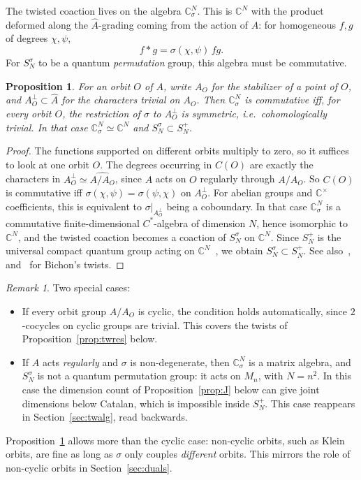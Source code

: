 \documentclass[11pt]{amsart}
\newtheorem{proposition}[theorem]{Proposition}
\theoremstyle{definition}
\theoremstyle{remark}
\newtheorem{remark}[theorem]{Remark}
\theoremstyle{plain}
\numberwithin{equation}{section}
\numberwithin{table}{section}
\newcommand{\C}{\mathbb C}
\begin{document}
The twisted coaction lives on the algebra $\C^N_\sigma$. This is $\C^N$ with the product deformed along the $\widehat A$-grading coming from the action of $A$: for homogeneous $f,g$ of degrees $\chi,\psi$,
\[
f*g=\sigma(\chi,\psi)\,fg .
\]
For $S_N^\sigma$ to be a quantum \emph{permutation} group, this algebra must be commutative.

\begin{proposition}\label{prop:comm}
For an orbit $O$ of $A$, write $A_O$ for the stabilizer of a point of $O$, and $A_O^\perp\subset\widehat A$ for the characters trivial on $A_O$. Then $\C^N_\sigma$ is commutative iff, for every orbit $O$, the restriction of $\sigma$ to $A_O^\perp$ is symmetric, i.e.\ cohomologically trivial. In that case $\C^N_\sigma\simeq\C^N$ and $S_N^\sigma\subset S_N^+$.
\end{proposition}

\begin{proof}
The functions supported on different orbits multiply to zero, so it suffices to look at one orbit $O$. The degrees occurring in $C(O)$ are exactly the characters in $A_O^\perp\simeq\widehat{A/A_O}$, since $A$ acts on $O$ regularly through $A/A_O$. So $C(O)$ is commutative iff $\sigma(\chi,\psi)=\sigma(\psi,\chi)$ on $A_O^\perp$. For abelian groups and $\C^\times$ coefficients, this is equivalent to $\sigma|_{A_O^\perp}$ being a coboundary. In that case $\C^N_\sigma$ is a commutative finite-dimensional $C^*$-algebra of dimension $N$, hence isomorphic to $\C^N$, and the twisted coaction becomes a coaction of $S_N^\sigma$ on $\C^N$. Since $S_N^+$ is the universal compact quantum group acting on $\C^N$~\cite{wa}, we obtain $S_N^\sigma\subset S_N^+$. See also~\cite[Prop.~8.1, Ex.~8.2]{bbn}, and~\cite{bi00} for Bichon's twists.
\end{proof}

\begin{remark}\label{rem:twcases}
Two special cases:
\begin{itemize}
\item If every orbit group $A/A_O$ is cyclic, the condition holds automatically, since $2$-cocycles on cyclic groups are trivial. This covers the twists of Proposition~\ref{prop:twres} below.
\item If $A$ acts \emph{regularly} and $\sigma$ is non-degenerate, then $\C^N_\sigma$ is a matrix algebra, and $S_N^\sigma$ is not a quantum permutation group: it acts on $M_n$, with $N=n^2$. In this case the dimension count of Proposition~\ref{prop:J} below can give joint dimensions below Catalan, which is impossible inside $S_N^+$. This case reappears in Section~\ref{sec:twalg}, read backwards.
\end{itemize}
Proposition~\ref{prop:comm} allows more than the cyclic case: non-cyclic orbits, such as Klein orbits, are fine as long as $\sigma$ only couples \emph{different} orbits. This mirrors the role of non-cyclic orbits in Section~\ref{sec:duals}.
\end{remark}
\end{document}
